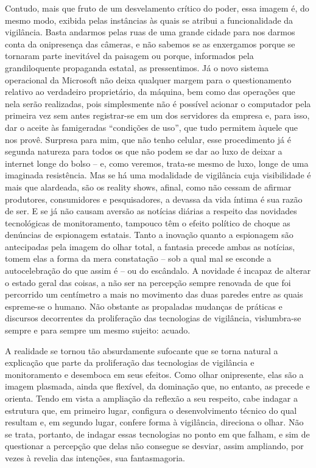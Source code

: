 Contudo, mais que fruto de um desvelamento crítico do poder, essa imagem
é, do mesmo modo, exibida pelas instâncias às quais se atribui a
funcionalidade da vigilância. Basta andarmos pelas ruas de uma grande
cidade para nos darmos conta da onipresença das câmeras, e não sabemos
se as enxergamos porque se tornaram parte inevitável da paisagem ou
porque, informados pela grandiloquente propaganda estatal, as
pressentimos. Já o novo sistema operacional da Microsoft não deixa
qualquer margem para o questionamento relativo ao verdadeiro
proprietário, da máquina, bem como das operações que nela serão
realizadas, pois simplesmente não é possível acionar o computador pela
primeira vez sem antes registrar-se em um dos servidores da empresa e,
para isso, dar o aceite às famigeradas ``condições de uso'', que tudo
permitem àquele que nos provê. Surpresa para mim, que não tenho celular,
esse procedimento já é segunda natureza para todos os que não podem se
dar ao luxo de deixar a internet longe do bolso -- e, como veremos,
trata-se mesmo de luxo, longe de uma imaginada resistência. Mas se há
uma modalidade de vigilância cuja visibilidade é mais que alardeada, são
os reality shows, afinal, como não cessam de afirmar produtores,
consumidores e pesquisadores, a devassa da vida íntima é sua razão de
ser. E se já não causam aversão as notícias diárias a respeito das
novidades tecnológicas de monitoramento, tampouco têm o efeito político
de choque as denúncias de espionagem estatais. Tanto a inovação quanto a
espionagem são antecipadas pela imagem do olhar total, a fantasia
precede ambas as notícias, tomem elas a forma da mera constatação -- sob
a qual mal se esconde a autocelebração do que assim é -- ou do
escândalo. A novidade é incapaz de alterar o estado geral das coisas, a
não ser na percepção sempre renovada de que foi percorrido um centímetro
a mais no movimento das duas paredes entre as quais espreme-se o humano.
Não obstante as propaladas mudanças de práticas e discursos decorrentes
da proliferação das tecnologias de vigilância, vislumbra-se sempre e
para sempre um mesmo sujeito: acuado.

A realidade se tornou tão absurdamente sufocante que se torna natural a
explicação que parte da proliferação das tecnologias de vigilância e
monitoramento e desemboca em seus efeitos. Como olhar onipresente, elas
são a imagem plasmada, ainda que flexível, da dominação que, no entanto,
as precede e orienta. Tendo em vista a ampliação da reflexão a seu
respeito, cabe indagar a estrutura que, em primeiro lugar, configura o
desenvolvimento técnico do qual resultam e, em segundo lugar, confere
forma à vigilância, direciona o olhar. Não se trata, portanto, de
indagar essas tecnologias no ponto em que falham, e sim de questionar a
percepção que delas não consegue se desviar, assim ampliando, por vezes
à revelia das intenções, sua fantasmagoria. ~

